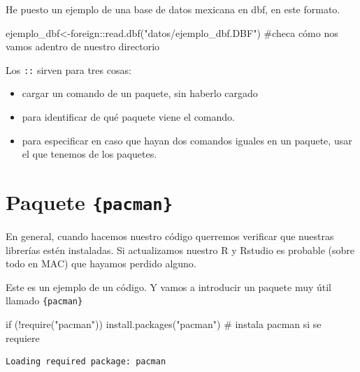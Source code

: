 \documentclass[
  letterpaper,
  DIV=11,
  numbers=noendperiod]{scrreprt}
\newenvironment{Shaded}{\begin{snugshade}}{\end{snugshade}}
\newcommand{\CommentTok}[1]{\textcolor[rgb]{0.37,0.37,0.37}{#1}}
\newcommand{\ControlFlowTok}[1]{\textcolor[rgb]{0.00,0.23,0.31}{#1}}
\newcommand{\FunctionTok}[1]{\textcolor[rgb]{0.28,0.35,0.67}{#1}}
\newcommand{\NormalTok}[1]{\textcolor[rgb]{0.00,0.23,0.31}{#1}}
\newcommand{\OtherTok}[1]{\textcolor[rgb]{0.00,0.23,0.31}{#1}}
\newcommand{\SpecialCharTok}[1]{\textcolor[rgb]{0.37,0.37,0.37}{#1}}
\newcommand{\StringTok}[1]{\textcolor[rgb]{0.13,0.47,0.30}{#1}}
\begin{document}
He puesto un ejemplo de una base de datos mexicana en dbf, en este
formato.

\begin{Shaded}
\begin{Highlighting}[]
\NormalTok{ejemplo\_dbf}\OtherTok{\textless{}{-}}\NormalTok{foreign}\SpecialCharTok{::}\FunctionTok{read.dbf}\NormalTok{(}\StringTok{"datos/ejemplo\_dbf.DBF"}\NormalTok{) }\CommentTok{\#checa cómo nos vamos adentro de nuestro directorio}
\end{Highlighting}
\end{Shaded}

Los \texttt{::} sirven para tres cosas:

\begin{itemize}
\item
  cargar un comando de un paquete, sin haberlo cargado
\item
  para identificar de qué paquete viene el comando.
\item
  para especificar en caso que hayan dos comandos iguales en un paquete,
  usar el que tenemos de los paquetes.
\end{itemize}

\hypertarget{paquete-pacman}{%
\section{\texorpdfstring{Paquete
\texttt{\{pacman\}}}{Paquete \{pacman\}}}\label{paquete-pacman}}

En general, cuando hacemos nuestro código querremos verificar que
nuestras librerías estén instaladas. Si actualizamos nuestro R y Rstudio
es probable (sobre todo en MAC) que hayamos perdido alguno.

Este es un ejemplo de un código. Y vamos a introducir un paquete muy
útil llamado \texttt{\{pacman\}}

\begin{Shaded}
\begin{Highlighting}[]
\ControlFlowTok{if}\NormalTok{ (}\SpecialCharTok{!}\FunctionTok{require}\NormalTok{(}\StringTok{"pacman"}\NormalTok{)) }\FunctionTok{install.packages}\NormalTok{(}\StringTok{"pacman"}\NormalTok{) }\CommentTok{\# instala pacman si se requiere}
\end{Highlighting}
\end{Shaded}

\begin{verbatim}
Loading required package: pacman
\end{verbatim}
\end{document}
